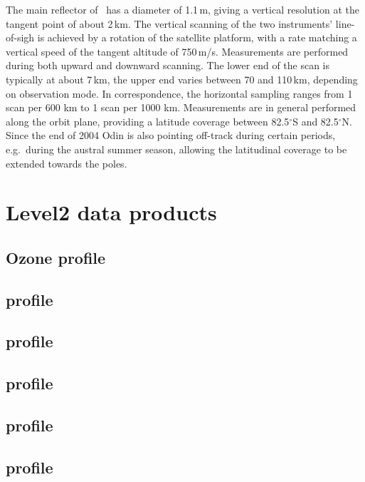The main reflector of \smr\ has a diameter of 1.1\,m, giving a
vertical resolution at the tangent point of about 2\,km. The vertical scanning
of the two instruments' line-of-sigh is achieved by a rotation of the satellite
platform, with a rate matching a vertical speed of the tangent altitude of
750\,m/s. Measurements are performed during both upward and downward scanning.
The lower end of the scan is typically at about 7\,km, the upper end varies
between 70 and 110\,km, depending on observation mode. In correspondence,
the horizontal sampling ranges from 1 scan per 600 km to 1 scan per 1000 km.
Measurements are in general performed along the orbit plane, providing a
latitude coverage between 82.5$^{\circ}$S and 82.5$^{\circ}$N. Since the end of
2004 Odin is also pointing off-track during certain periods, e.g.\ during the
austral summer season, allowing the latitudinal coverage to be extended towards
the poles. 


\section{\smr Level2 data products}

\subsection{Ozone profile}
\subsection{ profile}
\subsection{ profile}
\subsection{ profile} 
\subsection{ profile}
\subsection{ profile}


